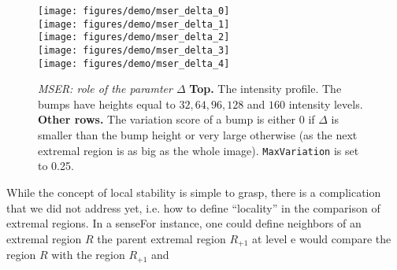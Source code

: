 \documentclass[9.5pt]{article}
\newcommand{\param}[1]{{\color{red}\tt   #1}}
\begin{document}
\begin{figure}
\begin{center}
\texttt{[image: figures/demo/mser\_delta\_0]}\\
\texttt{[image: figures/demo/mser\_delta\_1]}\\
\texttt{[image: figures/demo/mser\_delta\_2]}\\
\texttt{[image: figures/demo/mser\_delta\_3]}\\
\texttt{[image: figures/demo/mser\_delta\_4]}
\end{center}
\caption{{\em MSER: role of the paramter $\Delta$} {\bf Top.} The intensity profile. The bumps
have heights equal to $32,64,96,128$ and $160$ intensity levels. {\bf Other rows.} The variation score of a bump is either $0$ if $\Delta$ is smaller than the bump height or very large otherwise (as the next extremal region is as big as the whole image). 
\param{MaxVariation} is set to 0.25.}
\label{fig:mser-delta}
\end{figure}

While the concept of local stability is simple to grasp, there is a complication that we did not address yet, i.e. how to define ``locality'' in the comparison of extremal regions. In a senseFor instance, one could define neighbors of an extremal region $R$ the parent extremal region $R_{+1}$ at level e would compare the region $R$ with the region $R_{+1}$ and 


\end{document}
